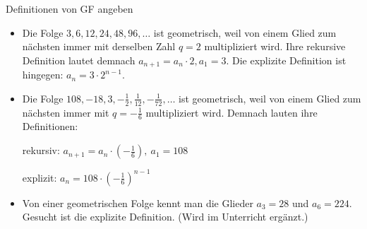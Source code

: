 \begin{bsp} {Definitionen von GF angeben}{}
    \begin{itemize}
        \item Die Folge $3, 6, 12, 24, 48, 96,\dots$ ist geometrisch, weil von einem Glied zum nächsten immer mit derselben Zahl $q=2$ multipliziert wird. Ihre rekursive Definition lautet demnach $a_{n+1}=a_n\cdot 2, a_1=3$. Die explizite Definition ist hingegen: $a_n=3\cdot 2^{n-1}$.
        \item Die Folge $108,-18, 3,- \frac{1}{2},\frac{1}{12},-\frac{1}{72}, \dots$  ist geometrisch, weil von einem Glied zum nächsten immer mit $q=-\frac{1}{6}$ multipliziert wird. Demnach lauten ihre Definitionen:
    
        rekursiv:  $a_{n+1}=a_n\cdot \left(-\frac{1}{6} \right)  , \   a_1=108$

        explizit: $a_n=108\cdot (-\frac{1}{6})^{n-1}$
        

        \item         
        Von einer geometrischen Folge kennt man die Glieder $a_3=28$ und $a_6=224$. Gesucht ist die explizite Definition. (Wird im Unterricht ergänzt.)
        
        \vspace*{7cm}

            


\end{itemize}
\end{bsp}
